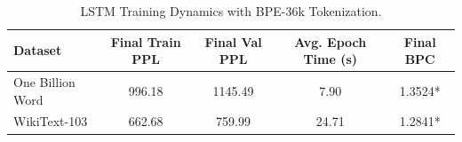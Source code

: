 \begin{table}[H]
\centering
\caption{LSTM Training Dynamics with BPE-36k Tokenization.}
\label{tab:lm_results}
\begin{tabular}{|l|c|c|c|c|}
\hline
\textbf{Dataset} & \textbf{Final Train PPL} & \textbf{Final Val PPL} & \textbf{Avg. Epoch Time (s)} & \textbf{Final BPC} \\ \hline
One Billion Word & 996.18 & 1145.49 & 7.90 & 1.3524* \\ \hline
WikiText-103     & 662.68 & 759.99  & 24.71 & 1.2841* \\ \hline
\end{tabular}
\end{table}